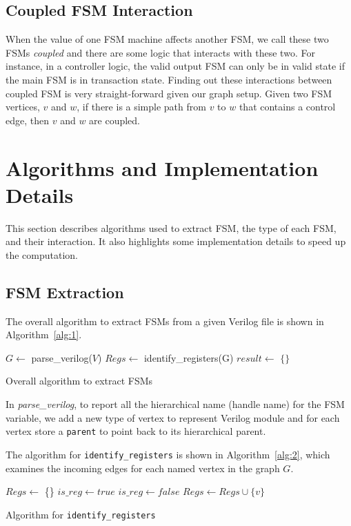 \documentclass{article}
\begin{document}
\subsection{Coupled FSM Interaction}
When the value of one FSM machine affects another FSM, we call these two FSMs \textit{coupled}
and there are some logic that interacts with these two. For instance, in a controller logic,
the valid output FSM can only be in valid state if the main FSM is in transaction state.
Finding out these interactions between coupled FSM is very straight-forward given our graph setup.
Given two FSM vertices, $v$ and $w$, if there is a simple path from $v$ to $w$ that contains
a control edge, then $v$ and $w$ are coupled.


\section{Algorithms and Implementation Details}
This section describes algorithms used to extract FSM, the type of each FSM, and their interaction.
It also highlights some implementation details to speed up the computation.

\subsection{FSM Extraction}

The overall algorithm to extract FSMs from a given Verilog file is shown in Algorithm~\ref{alg:1}.

\begin{algorithm}[!tbh]
    \label{alg:1}
    $G \gets$ parse\_verilog($V$)\;
    $Regs \gets$ identify\_registers(G)\;
    $result \gets$ $\{\}$\;
    \;
 \caption{Overall algorithm to extract FSMs}
\end{algorithm}

In \textit{parse\_verilog}, to report all the hierarchical name (handle name) for the FSM variable,
we add a new type of vertex to represent Verilog module and for each vertex store a
\texttt{parent} to point back to its hierarchical parent.

The algorithm for \texttt{identify\_registers} is shown in Algorithm~\ref{alg:2}, which examines
the incoming edges for each named vertex in the graph $G$.
\begin{algorithm}[!tbh]
    \label{alg:2}
    $Regs \gets$ \{\}\;
     {
        $is\_reg \gets true$\;
         {
             {
                $is\_reg \gets false$\;
                \Break\;
            }
        }
        $Regs \gets Regs \cup \{v\}$\;
    }
    \;
 \caption{Algorithm for \texttt{identify\_registers}}
\end{algorithm}
\end{document}

